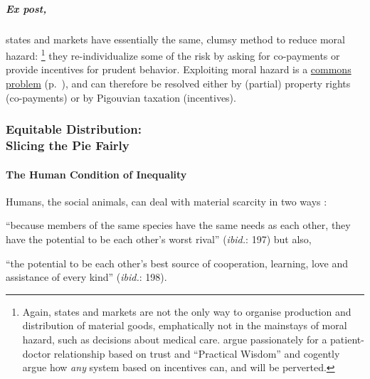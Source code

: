 \subparagraph{Ex post,} states and markets have essentially the same, clumsy method to reduce moral hazard:
\footnote{
	Again, states and markets are not the only way to organise production and distribution of material goods, emphatically not in the mainstays of moral hazard, such as decisions about medical care.
	\cite{Schwartz2010} argue passionately for a patient-doctor relationship based on trust and ``Practical Wisdom'' and cogently argue how \emph{any} system based on incentives can, and will be perverted.
}
they re-individualize some of the risk by asking for co-payments or provide incentives for prudent behavior.
Exploiting moral hazard is a \hyperref[sec:common-good]{commons problem} (p.~\pageref{sec:common-good}), and can therefore be resolved either by (partial) property rights (co-payments) or by Pigouvian taxation (incentives).

\subsubsection[Equitable Distribution]{Equitable Distribution: \\Slicing the Pie Fairly} \label{sec:distribution}


\paragraph{The Human Condition of Inequality}  \label{sec:human-condition-of-inequality} Humans, the social animals, can deal with material scarcity in two ways \citep{Pickett-2009-kx}: \begin{inparaenum}[1)]
	\item ``because members of the same species have the same needs as each other, they have the potential to be each other's worst rival'' (\emph{ibid.}: 197) but also,
	\item ``the potential to be each other's best source of cooperation, learning, love and assistance of every kind'' (\emph{ibid.}: 198). \end{inparaenum}


